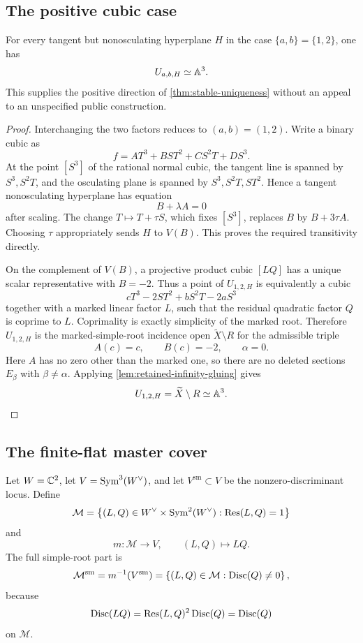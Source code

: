 \subsection{The positive cubic case}

\begin{proposition}
\label{prop:cubic-positive-internal}
For every tangent but nonosculating hyperplane \(H\) in the case
\(\{a,b\}=\{1,2\}\), one has
\[
U_{a,b,H}\simeq\mathbb A^3.
\]
This supplies the positive direction of \cref{thm:stable-uniqueness} without
an appeal to an unspecified public construction.
\end{proposition}

\begin{proof}
Interchanging the two factors reduces to \((a,b)=(1,2)\).  Write a binary
cubic as
\[
f=A T^3+B S T^2+C S^2T+D S^3.
\]
At the point \([S^3]\) of the rational normal cubic, the tangent line is
spanned by \(S^3,S^2T\), and the osculating plane is spanned by
\(S^3,S^2T,ST^2\).  Hence a tangent nonosculating hyperplane has equation
\[
B+\lambda A=0
\]
after scaling.  The change \(T\mapsto T+\tau S\), which fixes \([S^3]\),
replaces \(B\) by \(B+3\tau A\).  Choosing \(\tau\) appropriately sends
\(H\) to \(V(B)\).  This proves the required transitivity directly.

On the complement of \(V(B)\), a projective product cubic \([LQ]\) has a
unique scalar representative with \(B=-2\).  Thus a point of
\(U_{1,2,H}\) is equivalently a cubic
\[
cT^3-2ST^2+bS^2T-2aS^3
\]
together with a marked linear factor \(L\), such that the residual quadratic
factor \(Q\) is coprime to \(L\).  Coprimality is exactly simplicity of the
marked root.  Therefore \(U_{1,2,H}\) is the marked-simple-root incidence
open \(\widetilde X\setminus R\) for the admissible triple
\[
A(c)=c,\qquad B(c)=-2,\qquad\alpha=0.
\]
Here \(A\) has no zero other than the marked one, so there are no deleted
sections \(E_\beta\) with \(\beta\ne\alpha\).  Applying
\cref{lem:retained-infinity-gluing} gives
\[
U_{1,2,H}=\widetilde X\setminus R\simeq\mathbb A^3.
\]
\end{proof}

\subsection{The finite-flat master cover}

Let \(W=\mathbb C^2\), let \(V=\operatorname{Sym}^3(W^\vee)\), and let
\(V^{\mathrm{sm}}\subset V\) be the nonzero-discriminant locus.  Define
\[
\mathcal M=
\left\{(L,Q)\in W^\vee\times\operatorname{Sym}^2(W^\vee):\operatorname{Res}(L,Q)=1\right\}
\]
and
\[
m\colon\mathcal M\longrightarrow V,\qquad (L,Q)\longmapsto LQ.
\]
The full simple-root part is
\[
\mathcal M^{\mathrm{sm}}=m^{-1}(V^{\mathrm{sm}})
=\left\{(L,Q)\in\mathcal M:\operatorname{Disc}(Q)\ne0\right\},
\]
because
\[
\operatorname{Disc}(LQ)=\operatorname{Res}(L,Q)^2\operatorname{Disc}(Q)=\operatorname{Disc}(Q)
\]
on \(\mathcal M\).

